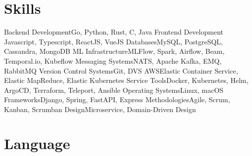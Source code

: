 \section{Skills}

\cvline%
{Backend Development}{Go, Python, Rust, C, Java}
\cvline%
{Frontend Development}
{Javascript, Typescript, ReactJS, VueJS}
\cvline%
{Databases}{MySQL, PostgreSQL, Cassandra, MongoDB}
\cvline%
{ML Infrastructure}{MLFlow, Spark, Airflow, Beam, Temporal.io, Kubeflow}
\cvline%
{Messaging Systems}{NATS, Apache Kafka, EMQ, RabbitMQ}
\cvline%
{Version Control Systems}{Git, DVS}
\cvline%
{AWS}{Elastic Container Service, Elastic MapReduce, Elastic Kubernetes Service}
\cvline%
{Tools}{Docker, Kubernetes, Helm, ArgoCD, Terraform, Teleport, Ansible}
\cvline%
{Operating Systems}{Linux, macOS}
\cvline%
{Frameworks}{Django, Spring, FastAPI, Express}
\cvline%
{Methodologies}{Agile, Scrum, Kanban, Scrumban}
\cvline%
{Design}{Microservice, Domain-Driven Design}

\section{Language}


\emptysection{}\closesection{}
